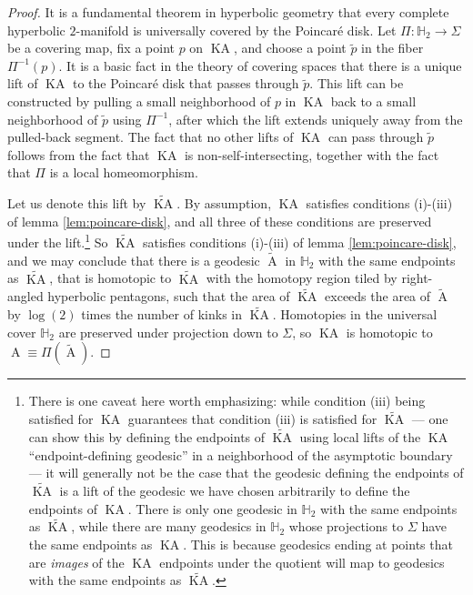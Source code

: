 \documentclass[a4paper,11pt]{article}
\renewcommand{\tilde}{\widetilde}
\newcommand{\KA}{\operatorname{KA}}
\newcommand{\A}{\operatorname{A}}
\begin{document}
\begin{proof}
    It is a fundamental theorem in hyperbolic geometry that every complete hyperbolic $2$-manifold is universally covered by the Poincar\'{e} disk. Let $\Pi : \mathbb{H}_{2} \rightarrow \Sigma$ be a covering map, fix a point $p$ on $\KA$, and choose a point $\tilde{p}$ in the fiber $\Pi^{-1}(p)$. It is a basic fact in the theory of covering spaces that there is a unique lift of $\KA$ to the Poincar\'{e} disk that passes through $\tilde{p}$. This lift can be constructed by pulling a small neighborhood of $p$ in $\KA$ back to a small neighborhood of $\tilde{p}$ using $\Pi^{-1}$, after which the lift extends uniquely away from the pulled-back segment. The fact that no other lifts of $\KA$ can pass through $\tilde{p}$ follows from the fact that $\KA$ is non-self-intersecting, together with the fact that $\Pi$ is a local homeomorphism.
    
    Let us denote this lift by $\tilde{\KA}.$ By assumption, $\KA$ satisfies conditions (i)-(iii) of lemma \ref{lem:poincare-disk}, and all three of these conditions are preserved under the lift.\footnote{\label{footnote:multi-geodesic-caveat}There is one caveat here worth emphasizing: while condition (iii) being satisfied for $\KA$ guarantees that condition (iii) is satisfied for $\tilde{\KA}$ --- one can show this by defining the endpoints of $\tilde{\KA}$ using local lifts of the $\KA$ ``endpoint-defining geodesic'' in a neighborhood of the asymptotic boundary --- it will generally not be the case that the geodesic defining the endpoints of $\tilde{\KA}$ is a lift of the geodesic we have chosen arbitrarily to define the endpoints of $\KA$. There is only one geodesic in $\mathbb{H}_{2}$ with the same endpoints as $\tilde{\KA}$, while there are many geodesics in $\mathbb{H}_{2}$ whose projections to $\Sigma$ have the same endpoints as $\KA$. This is because geodesics ending at points that are \textit{images} of the $\KA$ endpoints under the quotient will map to geodesics with the same endpoints as $\tilde{\KA}$.} So $\tilde{\KA}$ satisfies conditions (i)-(iii) of lemma \ref{lem:poincare-disk}, and we may conclude that there is a geodesic $\tilde{\A}$ in $\mathbb{H}_{2}$ with the same endpoints as $\tilde{\KA}$, that is homotopic to $\tilde{\KA}$ with the homotopy region tiled by right-angled hyperbolic pentagons, such that the area of $\tilde{\KA}$ exceeds the area of $\tilde{\A}$ by $\log(2)$ times the number of kinks in $\tilde{\KA}$. Homotopies in the universal cover $\mathbb{H}_{2}$ are preserved under projection down to $\Sigma$, so $\KA$ is homotopic to $\A \equiv \Pi(\tilde{\A})$.
    

\end{proof}
\end{document}
